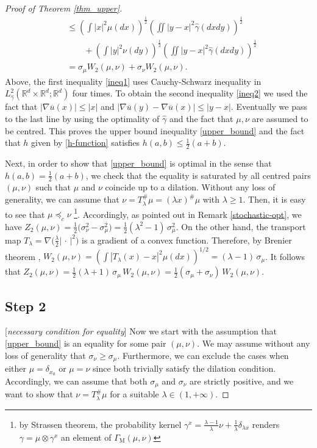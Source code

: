 \documentclass[11pt,reqno]{amsart}
\theoremstyle{definition}
\numberwithin{equation}{section}
\newcommand{\R}{\mathbb{R}}
\newcommand{\Rd}{{\R^d}}
\newcommand{\ov}{\overline}
\newcommand{\argu}{{\,\cdot\,}}
\newcommand{\abs}[1]{{\left \lvert #1 \right \rvert}}
\begin{document}
\begin{proof}[Proof of Theorem \ref{thm_upper}]
\begin{align}
		\label{ineq2}
	& \leq \left(\int \abs{x}^2 \mu(dx) \right)^{\frac{1}{2}} \left(\iint \abs{y-x}^2 \hat\gamma(dxdy) \right)^{\frac{1}{2}} \\
	\nonumber
	& \qquad +\left(\int \abs{y}^2 \nu(dy) \right)^{\frac{1}{2}} \left(\iint \abs{y-x}^2 \hat\gamma(dxdy) \right)^{\frac{1}{2}} \\
	\nonumber
	& = \sigma_\mu W_2(\mu,\nu) + \sigma_\nu W_2(\mu,\nu).
\end{align}
Above, the first inequality \eqref{ineq1} uses  Cauchy-Schwarz inequality in $L^2_{\hat{\gamma}}(\Rd \times \Rd;\Rd)$ four times. To obtain the second inequality \eqref{ineq2} we used the fact that  $\abs{\nabla \ov{u}(x)} \leq \abs{x}$ and $\abs{\nabla \ov{u}(y) - \nabla \ov{u}(x)} \leq \abs{y-x}$. Eventually we  pass to the last line by using the optimality of $\hat\gamma$ and  the fact that $\mu, \nu$ are assumed to be centred. This proves the upper bound inequality \eqref{upper_bound} and the fact that $h$ given by \eqref{h-function} satisfies  $h(a,b)\le \frac1{2} (a+b)$.

Next, in order to show that  \eqref{upper_bound} is optimal in the sense that $h(a,b)= \frac1{2} (a+b)$, we check that the equality is saturated by all centred pairs $(\mu,\nu)$  
such that $\mu$ and $\nu$ coincide up to a dilation. Without any loss of generality, we can assume that $\nu = T_\lambda^\# \mu = (\lambda x) ^\# \mu $  with $\lambda \ge1$. Then, it is easy to see that $\mu \preceq_c \nu$ \footnote{by Strassen theorem, the probability kernel $\gamma^x  = \frac{\lambda-1}{\lambda} \nu + \frac{1}{\lambda} \delta_{\lambda x}$ renders $\gamma = \mu \otimes \gamma^x$ an element of $\Gamma_{\mathrm{M}}(\mu,\nu)$}. Accordingly, as pointed out in Remark \ref{stochastic-opt}, we have  $Z_2(\mu,\nu) = \frac{1}{2}\big(\sigma_\nu^2 - \sigma^2_\mu\big) = \frac{1}{2}(\lambda^2-1) \,\sigma^2_\mu$. On the other hand, the transport map $T_\lambda =\nabla \big( \frac{\lambda}{2} \abs{\argu}^2\big)$ is a gradient of a convex function. Therefore, by Brenier theorem \cite{brenier1991},  $W_2(\mu,\nu) = (\int \abs{T_\lambda(x)-x}^2 \mu(dx))^{1/2} = (\lambda- 1)\, \sigma_\mu$. 
It follows that $Z_2(\mu,\nu) = \frac{1}{2} (\lambda+1) \,\sigma_\mu \, W_2(\mu,\nu) = \frac{1}{2} (\sigma_\mu+\sigma_\nu)\, W_2(\mu,\nu) .$
 

\subsection*{Step 2}[\emph{necessary condition for equality}]
Now we  start with the assumption that \eqref{upper_bound} is an equality for some pair $(\mu,\nu)$. We may assume without any loss of generality that $\sigma_\nu \ge \sigma_\mu$. Furthermore, we can exclude the cases when either $\mu = \delta_{x_0}$ or $\mu = \nu$ since both trivially satisfy the dilation condition.   Accordingly,  we  can assume that both $\sigma_\mu$ and $\sigma_\nu$ are strictly positive, and we  want to show  that  $\nu = T_\lambda^\# \mu$ for a suitable $\lambda\in (1, +\infty)$.


\end{proof}
\end{document}
